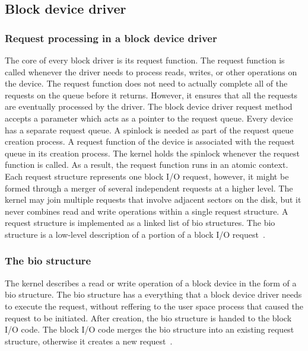 \subsection{Block device driver}
\subsubsection*{Request processing in a block device driver}
\label{subsec:request queue}
The core of every block driver is its request function. The request function is called whenever the driver needs to process reads, writes, or other operations on the device. The request function does not need to actually complete all of the requests on the queue before it returns. However, it ensures that all the requests are eventually processed by the driver. The block device driver request method accepts a parameter which acts as a pointer to the request queue. Every device has a separate request queue. A spinlock is needed as part of the request queue creation process. A request function of the device is associated with the request queue in its creation process. The kernel holds the spinlock whenever the request function is called. As a result, the request function runs in an atomic context.
\\[3mm]
Each request structure represents one block I/O request, however, it might be formed through a merger of several independent requests at a higher level.
The kernel may join multiple requests that involve adjacent sectors on the disk, but it never combines read and write operations within a single request structure. A request structure is implemented as a linked list of bio structures. The bio structure is a low-level description of a portion of a block I/O request~\cite{Corbet:2005:LDD:1209083}.

\subsubsection*{The bio structure}
The kernel describes a read or write operation of a block device in the form of a bio structure. The bio structure has a everything that a block device driver needs to execute the request, without reffering to the user space process that caused the request to be initiated. After creation, the bio structure is handed to the block I/O code. The block I/O code merges the bio structure into an existing request structure, otherwise it creates a new request~\cite{Corbet:2005:LDD:1209083}. 

